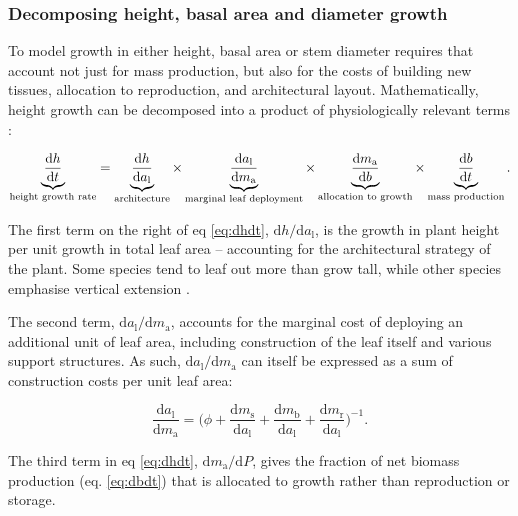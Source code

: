 \documentclass[12pt, a4paper]{article}
\begin{document}
\subsubsection{Decomposing height, basal area and diameter growth}

To model growth in either height, basal area or stem diameter requires that account not just for mass production, but also for the costs of building new tissues, allocation to reproduction, and architectural layout. Mathematically, height growth can be decomposed into a product of physiologically relevant terms \citep{falster-2011}:

\begin{equation} \label{eq:dhdt}
\underbrace{\strut\frac{\textrm{d}h}{\textrm{d}t}}_\textrm{height growth rate}= \underbrace{\strut\frac{\textrm{d}h}{\textrm{d}a_\textrm{l}}}_\textrm{architecture}
\times \underbrace{\strut\frac{\textrm{d}a_\textrm{l}}{\textrm{d}m_\textrm{a}}}_\textrm{marginal leaf deployment}
\times \underbrace{\strut\frac{\textrm{d}m_\textrm{a}}{\textrm{d}b}}_\textrm{allocation to growth}
\times \underbrace{\strut\frac{\textrm{d}b}{\textrm{d}t}}_\textrm{mass production}.
\end{equation}

The first term on the right of eq \ref{eq:dhdt},
$\textrm{d}h / \textrm{d}a_\textrm{l}$, is the growth in plant height
per unit growth in total leaf area -- accounting for the architectural
strategy of the plant. Some species tend to leaf out more than grow
tall, while other species emphasise vertical
extension \citep{poorter-2006}.

The second term, $\textrm{d}a_\textrm{l} / \textrm{d}m_\textrm{a}$,
accounts for the marginal cost of deploying an additional unit of leaf
area, including construction of the leaf itself and various support
structures. As such, $\textrm{d}a_\textrm{l} / \textrm{d}m_\textrm{a}$
can itself be expressed as a sum of construction costs per unit leaf
area:

\begin{equation}\label{eq:daldmt}
\frac{\textrm{d}a_\textrm{l}}{\textrm{d}m_\textrm{a}}
= \big(\phi
 + \frac{\textrm{d}m_\textrm{s}}{\textrm{d}a_\textrm{l}} + \frac{\textrm{d}m_\textrm{b}}{\textrm{d}a_\textrm{l}} + \frac{\textrm{d}m_\textrm{r}}{\textrm{d}a_\textrm{l}}\big)^{-1}.
\end{equation}

The third term in eq \ref{eq:dhdt},
$\textrm{d}m_\textrm{a} / \textrm{d}P$, gives the fraction of net
biomass production (eq. \ref{eq:dbdt}) that is allocated to growth
rather than reproduction or storage.
\end{document}
